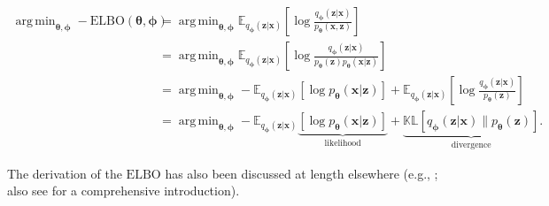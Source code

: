 \documentclass[11pt,a4paper,twoside]{book}
\DeclareMathOperator*{\argmin}{arg\,min}
\begin{document}
\begin{doublespace}
\begin{appendices}
\begin{subequations}
\begin{align}
    \argmin_{\boldsymbol{\theta}, \boldsymbol{\phi}}-\mathrm{ELBO}(\boldsymbol{\theta}, \boldsymbol{\phi}) &= \argmin_{\boldsymbol{\theta}, \boldsymbol{\phi}} \mathbb{E}_{    q_{\boldsymbol{\phi}}(\mathbf{z} | \mathbf{x})}\left[ \log\frac{q_{\boldsymbol{\phi}}(\mathbf{z} | \mathbf{x})}{p_{\boldsymbol{\theta}}(\mathbf{x}, \mathbf{z})}\right] \\
    &= \argmin_{\boldsymbol{\theta}, \boldsymbol{\phi}} \mathbb{E}_{    q_{\boldsymbol{\phi}}(\mathbf{z} | \mathbf{x})}\left[ \log\frac{q_{\boldsymbol{\phi}}(\mathbf{z} | \mathbf{x})}{p_{\boldsymbol{\theta}}(\mathbf{z})p_{\boldsymbol{\theta}}(\mathbf{x} | \mathbf{z})}\right] \\ 
    &= \argmin_{\boldsymbol{\theta}, \boldsymbol{\phi}} -\mathbb{E}_{    q_{\boldsymbol{\phi}}(\mathbf{z} | \mathbf{x})}\left[ \log p_{\boldsymbol{\theta}}(\mathbf{x} | \mathbf{z})\right] + \mathbb{E}_{    q_{\boldsymbol{\phi}}(\mathbf{z} | \mathbf{x})}\left[ \log\frac{q_{\boldsymbol{\phi}}(\mathbf{z} | \mathbf{x})}{p_{\boldsymbol{\theta}}(\mathbf{z})}\right] \label{eq:expected_elbo}\\
    &= \argmin_{\boldsymbol{\theta}, \boldsymbol{\phi}} -\mathbb{E}_{q_{\boldsymbol{\phi}}(\mathbf{z} | \mathbf{x})}\underbrace{\left[\log p_{\boldsymbol{\theta}}(\mathbf{x} | \mathbf{z})\right]}_{\textrm{likelihood}} + \underbrace{\mathbb{KL}[q_{\boldsymbol{\phi}}(\mathbf{z} | \mathbf{x}) \| p_{\boldsymbol{\theta}}(\mathbf{z})]}_{\textrm{divergence}}. \label{eq:elbo_2}
\end{align}
\end{subequations}

The derivation of the $\mathrm{ELBO}$ has also been discussed at length elsewhere (e.g., \citealt{kingma2013vae, kingma2014semi, burda2015iwae, alemi2016deep, dilokthanakul2016gmvae, alemi2017fixing, ding2018scvis}; also see \citealt{kingma2019introduction} for a comprehensive introduction).



\end{appendices}
\end{doublespace}
\end{document}
